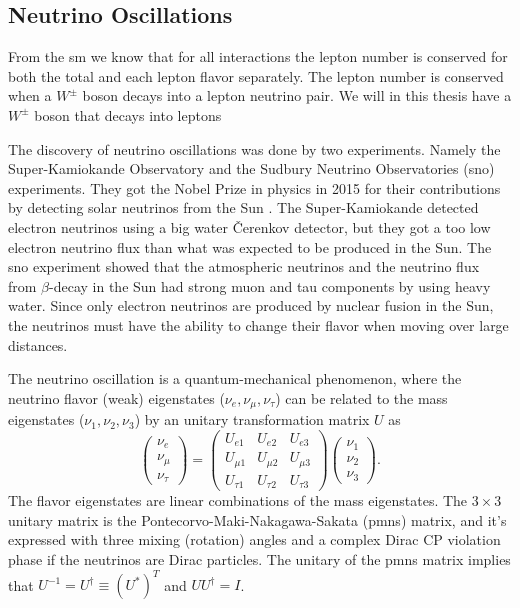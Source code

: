 \documentclass[a4paper, american, 12pt]{report}
\begin{document}
	
	\subsection{Neutrino Oscillations}
	\label{subsect:Theory-N_oscillations}
	From the \acrshort{sm} we know that for all interactions the lepton number is conserved for both the total and each lepton flavor separately. The lepton number is conserved when a $W^{\pm}$ boson decays into a lepton neutrino pair. We will in this thesis have a $W^{\pm}$ boson that decays into leptons
	
	The discovery of neutrino oscillations was done by two experiments. Namely the Super-Kamiokande Observatory\cite{superkamiokande} and the Sudbury Neutrino Observatories (\acrshort{sno})\cite{SNO} experiments. They got the Nobel Prize in physics in 2015 for their contributions by detecting solar neutrinos from the Sun \cite{gibney2015neutrino}. The Super-Kamiokande detected electron neutrinos using a big water \v{C}erenkov detector, but they got a too low electron neutrino flux than what was expected to be produced in the Sun. The \acrshort{sno} experiment showed that the atmospheric neutrinos and the neutrino flux from $\beta$-decay in the Sun had strong muon and tau components by using heavy water. Since only electron neutrinos are produced by nuclear fusion in the Sun, the neutrinos must have the ability to change their flavor when moving over large distances.
	
	The neutrino oscillation is a quantum-mechanical phenomenon, where the neutrino flavor (weak) eigenstates ($\nu_e, \nu_{\mu}, \nu_{\tau}$) can be related to the mass eigenstates ($\nu_1, \nu_{2}, \nu_{3}$) by an unitary transformation matrix $U$ as 
	\begin{equation}
	\label{eq:Flavor_states}
		\begin{pmatrix}
		\nu_e \\ \nu_{\mu} \\ \nu_{\tau}
		\end{pmatrix} 
		= \begin{pmatrix}
		U_{e1} & U_{e2} & U_{e3} \\
		U_{\mu1} & U_{\mu2} & U_{\mu3} \\
		U_{\tau1} & U_{\tau2} & U_{\tau3}
		\end{pmatrix}
		\begin{pmatrix}
		\nu_1 \\ \nu_{2} \\ \nu_{3}
		\end{pmatrix}.
	\end{equation} 
	The flavor eigenstates are linear combinations of the mass eigenstates. The $3\times3$ unitary matrix is the Pontecorvo-Maki-Nakagawa-Sakata (\acrshort{pmns}) matrix, and  it's expressed with three mixing (rotation) angles and a complex Dirac CP violation phase if the neutrinos are Dirac particles. The unitary of the \acrshort{pmns} matrix implies that $U^{-1}=U^{\dagger}\equiv(U^*)^T$ and $UU^{\dagger}=I$.
	
\end{document}
